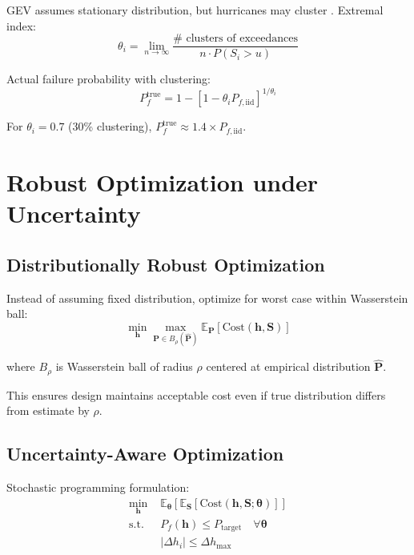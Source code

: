 \documentclass[review]{elsarticle}
\begin{document}
GEV assumes stationary distribution, but hurricanes may cluster \cite{elsner2012clustering}. Extremal index:
\begin{equation}
\theta_i = \lim_{n\to\infty} \frac{\text{# clusters of exceedances}}{n \cdot P(S_i > u)}
\end{equation}

Actual failure probability with clustering:
\begin{equation}
P_f^{\text{true}} = 1 - [1 - \theta_i P_{f,\text{iid}}]^{1/\theta_i}
\label{eq:clustered}
\end{equation}

For $\theta_i = 0.7$ (30\% clustering), $P_f^{\text{true}} \approx 1.4 \times P_{f,\text{iid}}$.

\section{Robust Optimization under Uncertainty}

\subsection{Distributionally Robust Optimization}

Instead of assuming fixed distribution, optimize for worst case within Wasserstein ball:
\begin{equation}
\min_{\mathbf{h}} \max_{\mathbf{P} \in B_\rho(\hat{\mathbf{P}})} \mathbb{E}_\mathbf{P}[\text{Cost}(\mathbf{h}, \mathbf{S})]
\label{eq:dro}
\end{equation}

where $B_\rho$ is Wasserstein ball of radius $\rho$ centered at empirical distribution $\hat{\mathbf{P}}$.

This ensures design maintains acceptable cost even if true distribution differs from estimate by $\rho$.

\subsection{Uncertainty-Aware Optimization}

Stochastic programming formulation:
\begin{align}
\min_{\mathbf{h}} &\,\, \mathbb{E}_{\boldsymbol{\theta}}[\mathbb{E}_{\mathbf{S}}[\text{Cost}(\mathbf{h}, \mathbf{S}; \boldsymbol{\theta})]]\\
\text{s.t.} &\,\, P_f(\mathbf{h}) \leq P_{\text{target}} \quad \forall \boldsymbol{\theta}\\
&\,\, |\Delta h_i| \leq \Delta h_{\max}
\end{align}
\end{document}
